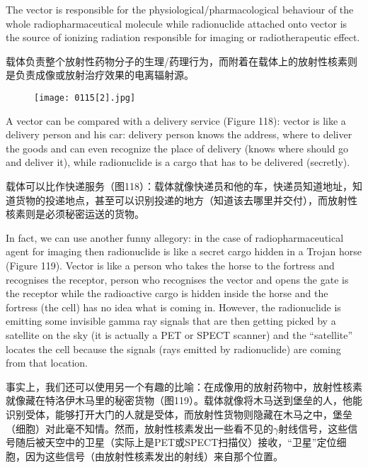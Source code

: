 \documentclass[dvipsnames, svgnames,a4paper,11pt]{article}
\begin{document}
The vector is responsible for the physiological/pharmacological behaviour of the
whole radiopharmaceutical molecule while radionuclide attached onto vector is the
source of ionizing radiation responsible for imaging or radiotherapeutic effect.

载体负责整个放射性药物分子的生理/药理行为，而附着在载体上的放射性核素则是负责成像或放射治疗效果的电离辐射源。

\begin{figure}[h]
    \centering
    \texttt{[image: 0115[2].jpg]}
     \label{fig118}
\end{figure}

A vector can be compared with a delivery service (Figure 118): vector is like a
delivery person and his car: delivery person knows the address, where to deliver the
goods and can even recognize the place of delivery (knows where should go and
deliver it), while radionuclide is a cargo that has to be delivered (secretly).

载体可以比作快递服务（图118）：载体就像快递员和他的车，快递员知道地址，知道货物的投递地点，甚至可以识别投递的地方（知道该去哪里并交付），而放射性核素则是必须秘密运送的货物。



In fact, we can use another funny allegory: in the case of radiopharmaceutical agent
for imaging then radionuclide is like a secret cargo hidden in a Trojan horse (Figure
119). Vector is like a person who takes the horse to the fortress and recognises the
receptor, person who recognises the vector and opens the gate is the receptor while
the radioactive cargo is hidden inside the horse and the fortress (the cell) has no
idea what is coming in. However, the radionuclide is emitting some invisible gamma
ray signals that are then getting picked by a satellite on the sky (it is actually a PET
or SPECT scanner) and the “satellite” locates the cell because the signals (rays
emitted by radionuclide) are coming from that location.

事实上，我们还可以使用另一个有趣的比喻：在成像用的放射药物中，放射性核素就像藏在特洛伊木马里的秘密货物（图119）。载体就像将木马送到堡垒的人，他能识别受体，能够打开大门的人就是受体，而放射性货物则隐藏在木马之中，堡垒（细胞）对此毫不知情。然而，放射性核素发出一些看不见的$\gamma$射线信号，这些信号随后被天空中的卫星（实际上是PET或SPECT扫描仪）接收，“卫星”定位细胞，因为这些信号（由放射性核素发出的射线）来自那个位置。
\end{document}
